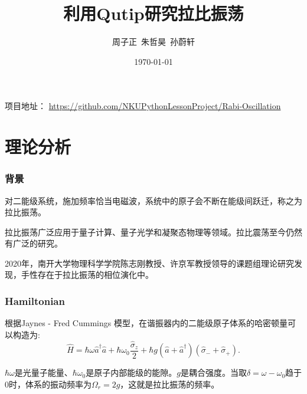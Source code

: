 \documentclass[aspectratio=169, 12pt]{beamer}
\title{利用Qutip研究拉比振荡}
\author[周子正.等]{周子正\ 朱哲昊\ 孙蔚轩}
\institute[南开大学]{南开大学\ 物理科学学院、金融学院}
\date{\today}
\begin{document}
\begin{frame}
    \titlepage
    \centering
    \small 项目地址：
    \url{https://github.com/NKUPythonLessonProject/Rabi-Oscillation}
\end{frame}
\AtBeginSection[]{\frame{\sectionpage}}
\begin{frame}
    \tableofcontents[hideallsubsections]
\end{frame}

\section{理论分析}

\begin{frame}
    \frametitle{背景}
    对二能级系统，施加频率恰当电磁波，系统中的原子会不断在能级间跃迁，称之为拉比振荡\cite{zhu_vacuum_1990}。

    \vspace{.7cm}

    拉比振荡广泛应用于量子计算、量子光学和凝聚态物理等领域。拉比震荡至今仍然有广泛的研究。

    \vspace{.7cm}

    2020年，南开大学物理科学学院陈志刚教授、许京军教授领导的课题组理论研究发现，手性存在于拉比振荡的相位演化中\cite{zhang_unveiling_2020}。
\end{frame}

\begin{frame}
    \frametitle{Hamiltonian}
    根据Jaynes - Fred Cummings 模型\cite{jaynes_comparison_1963}\cite{cummings_reminiscing_2013}，在谐振器内的二能级原子体系的哈密顿量可以构造为:
    \begin{equation}
        \hat{H}=\hbar \omega \hat{a}^{\dagger} \hat{a}+\hbar \omega_{0} \frac{\hat{\sigma}_{z}}{2}+\hbar g\left(\hat{a} +\hat{a}^{\dagger} \right)\left(\hat{\sigma}_{-}+\hat{\sigma}_{+}\right).
        \label{equ:H}
    \end{equation}

    $\hbar\omega$是光量子能量、$\hbar\omega_0$是原子内部能级的能隙。$g$是耦合强度。当取$\delta  = \omega-\omega_0$趋于0时，体系的振动频率为$\Omega_r = 2g$，这就是拉比振荡的频率。
\end{frame}
\end{document}
